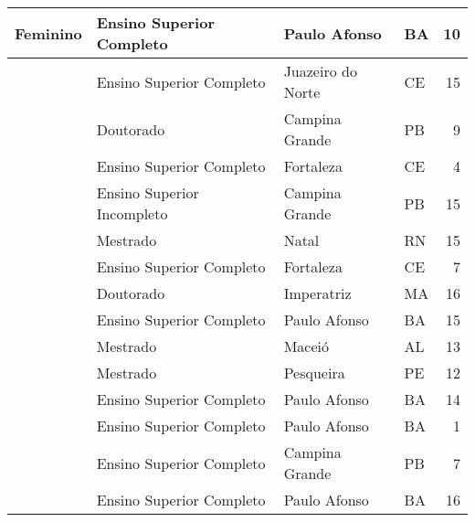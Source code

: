 \begin{table}[h]
\begin{tabular}{|l|l|l|l|r|}
\multirow{-13}{*}{Feminino}  & Ensino Superior Completo                      & Paulo Afonso      & BA & 10                      \\ \hline
                             & Ensino Superior Completo                      & Juazeiro do Norte & CE & 15                      \\ \cline{2-5} 
                             & Doutorado                                     & Campina Grande    & PB & 9                      \\ \cline{2-5} 
                             & Ensino Superior Completo                      & Fortaleza         & CE & 4                       \\ \cline{2-5} 
                             & Ensino Superior Incompleto                    & Campina Grande    & PB & 15                      \\ \cline{2-5} 
                             & Mestrado                                      & Natal             & RN & 15                      \\ \cline{2-5} 
                             & Ensino Superior Completo                      & Fortaleza         & CE & 7                      \\ \cline{2-5} 
                             & Doutorado                                     & Imperatriz        & MA & 16                      \\ \cline{2-5} 
                             & Ensino Superior Completo                      & Paulo Afonso      & BA & 15                      \\ \cline{2-5}
                             & Mestrado                                      & Maceió            & AL & 13                      \\ \cline{2-5} 
                             & Mestrado                                      & Pesqueira         & PE & 12                      \\ \cline{2-5} 
                             & Ensino Superior Completo                      & Paulo Afonso      & BA & 14                      \\ \cline{2-5} 
                             & Ensino Superior Completo                      & Paulo Afonso      & BA & 1                       \\ \cline{2-5} 
                             & Ensino Superior Completo                      & Campina Grande    & PB & 7                       \\ \cline{2-5} 
                             & Ensino Superior Completo                      & Paulo Afonso      & BA & 16                      \\ \cline{2-5} 

\end{tabular}
\end{table}
